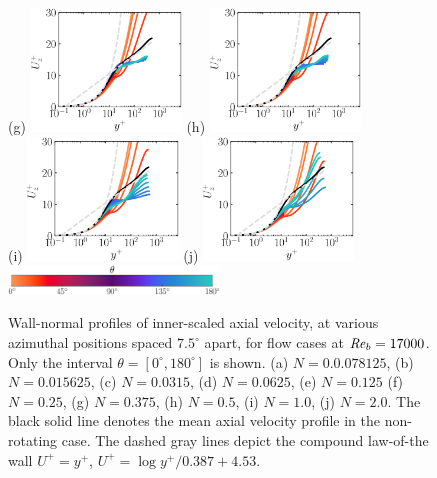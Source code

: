\documentclass[lineno]{jfm}
\begin{document}
\begin{figure}
                (g) \includegraphics[width=4cm]{Figures/prof_uzplus_rotz0_roty0.1875.eps}
                (h) \includegraphics[width=4cm]{Figures/prof_uzplus_rotz0_roty0.25.eps} \\
                (i) \includegraphics[width=4cm]{Figures/prof_uzplus_rotz0_roty0.5.eps}
                (j) \includegraphics[width=4cm]{Figures/prof_uzplus_rotz0_roty1.0.eps} \\
	    	\includegraphics[width=0.5\textwidth]{Figures/theta_cmap.eps}
    	\caption{
    		Wall-normal profiles of 
    		inner-scaled axial velocity,
    		at various azimuthal positions spaced 
		$7.5^\circ$ apart,
		for flow cases at $\mbox{\textit{Re}}_b=17000$.
		Only the interval $\theta = [0^{\circ},180^{\circ}]$ is shown.
    	        (a) $N = 0.0.078125$,
                (b) $N = 0.015625$,
                (c) $N = 0.0315$,
                (d) $N = 0.0625$,
                (e) $N = 0.125$
                (f) $N = 0.25$,
                (g) $N = 0.375$,
                (h) $N = 0.5$,
                (i) $N = 1.0$,
                (j) $N = 2.0$.	
    		The black solid line denotes the mean axial velocity profile in the
    		non-rotating case.
    		The dashed gray lines depict the compound law-of-the wall
    		$U^+=y^+$, $U^+=\log y^+/0.387 + 4.53$.
    	}
		\label{fig:uplus}
	\end{figure}
\end{document}
